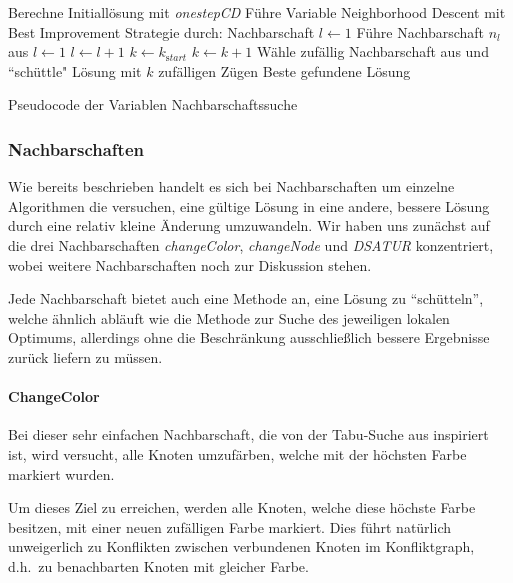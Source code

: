 \documentclass[paper=a4,fontsize=12pt]{scrartcl}
\begin{document}
{\begin{algorithm}
\begin{algorithmic}[1]
\State Berechne Initiallösung mit \emph{onestepCD}
\State Führe Variable Neighborhood Descent mit Best Improvement Strategie durch:
\State Nachbarschaft $l \leftarrow 1$
\State Führe Nachbarschaft $n_l$ aus
\State  $l\leftarrow 1$  
\Else
\State  $l\leftarrow l + 1$
\EndIf
\EndWhile
{}
\State $k \leftarrow k_{\mathrm start}$ 
\Else
\State $k \leftarrow k + 1$
\EndIf
\State Wähle zufällig Nachbarschaft aus und ``schüttle" Lösung mit $k$ zufälligen Zügen
\EndWhile
\State\Return Beste gefundene Lösung
\end{algorithmic}
\caption{Pseudocode der Variablen Nachbarschaftssuche}
\end{algorithm}
}

\subsubsection{Nachbarschaften}
\label{sec:neigh}
Wie bereits beschrieben handelt es sich bei Nachbarschaften um einzelne Algorithmen die versuchen, eine gültige Lösung in eine andere, bessere Lösung durch eine relativ kleine Änderung umzuwandeln. Wir haben uns zunächst auf die drei Nachbarschaften \emph{changeColor}, \emph{changeNode} und \emph{DSATUR} konzentriert, wobei weitere Nachbarschaften noch zur Diskussion stehen.

Jede Nachbarschaft bietet auch eine Methode an, eine Lösung zu ``schütteln'', welche ähnlich abläuft wie die Methode zur Suche des jeweiligen lokalen Optimums, allerdings ohne die Beschränkung ausschließlich bessere Ergebnisse zurück liefern zu müssen.

\paragraph{ChangeColor}
Bei dieser sehr einfachen Nachbarschaft, die von der Tabu-Suche aus \citet*{Noronha2006} inspiriert ist, wird versucht, alle Knoten umzufärben, welche mit der höchsten Farbe markiert wurden. 

Um dieses Ziel zu erreichen, werden alle Knoten, welche diese höchste Farbe besitzen, mit einer neuen zufälligen Farbe markiert. Dies führt natürlich unweigerlich zu Konflikten zwischen verbundenen Knoten im Konfliktgraph, d.h.\ zu benachbarten Knoten mit gleicher Farbe. 
\end{document}
